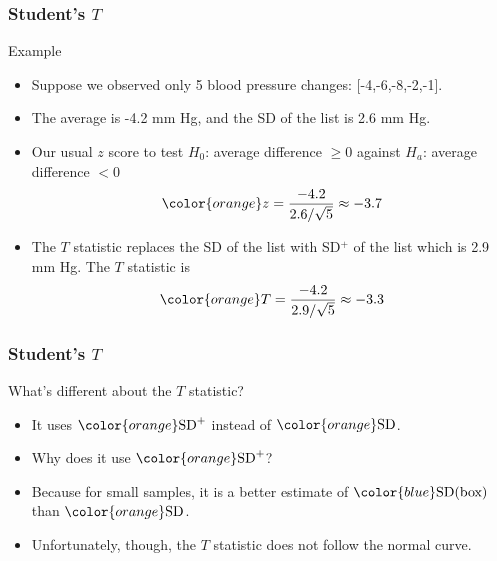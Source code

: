 \documentclass[handout]{beamer}
\begin{document}

   \begin{frame} \frametitle{Student's $T$}

   \begin{block}
     {Example}
     \begin{itemize}
     \item Suppose we observed only 5 blood pressure changes: [-4,-6,-8,-2,-1].
     \item The average is -4.2 mm Hg, and the SD of the list is 2.6 mm Hg.
     \item Our usual $z$ score to test $H_0$: average difference $\geq 0$
     against $H_a$: average difference $<0$
     $$
     {\color{orange} z = \frac{-4.2}{2.6 / \sqrt{5}} \approx -3.7}
     $$
     \item The $T$ statistic replaces the SD of the list with SD$^+$ of the list
     which is 2.9 mm Hg. The $T$ statistic is
     $$
     {\color{orange} T = \frac{-4.2}{2.9 / \sqrt{5}} \approx -3.3}
     $$
     \end{itemize}
   \end{block}
   \end{frame}


   \begin{frame} \frametitle{Student's $T$}

   \begin{block}
   {What's different about the $T$ statistic?}
   \begin{itemize}

     \item It uses ${\color{orange} \text{SD}^+}$ instead
     of ${\color{orange} \text{SD}}$.
     \item Why does it use ${\color{orange} \text{SD}^+}$?
       \item     Because for small samples,
     it is a better estimate of ${\color{blue} \text{SD(box)}}$
     than ${\color{orange} \text{SD}}$.

   \item Unfortunately, though, the $T$ statistic does not follow the
   normal curve.
   \end{itemize}
   \end{block}
   \end{frame}

\end{document}
